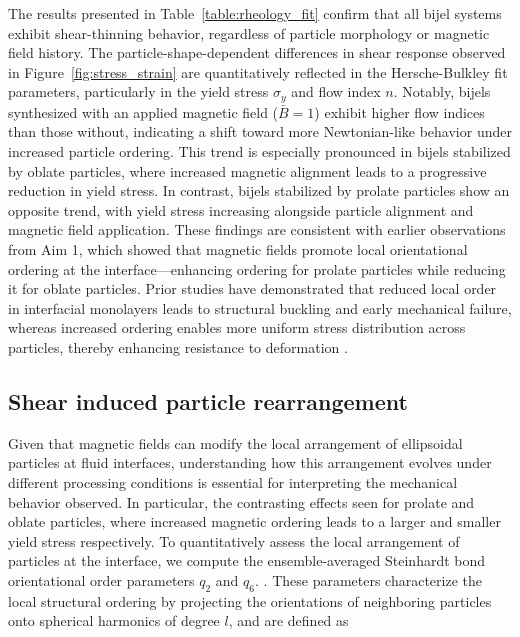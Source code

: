 The results presented in Table~\ref{table:rheology_fit} confirm that all bijel systems exhibit shear-thinning behavior, regardless of particle morphology or 
magnetic field history. The particle-shape-dependent differences in shear response observed in Figure~\ref{fig:stress_strain} are quantitatively reflected in 
the Hersche-Bulkley fit parameters, particularly in the yield stress $\sigma_y$ and flow index $n$. Notably, bijels synthesized with an applied magnetic field 
($\bar{B} = 1$) exhibit higher flow indices than those without, indicating a shift toward more Newtonian-like behavior under increased particle ordering. This 
trend is especially pronounced in bijels stabilized by oblate particles, where increased magnetic alignment leads to a progressive reduction in yield stress. 
In contrast, bijels stabilized by prolate particles show an opposite trend, with yield stress increasing alongside particle alignment and magnetic field 
application. These findings are consistent with earlier observations from Aim 1, which showed that magnetic fields promote local orientational ordering at the 
interface—enhancing ordering for prolate particles while reducing it for oblate particles. Prior studies have demonstrated that reduced local order in 
interfacial monolayers leads to structural buckling and early mechanical failure, whereas increased ordering enables more uniform stress distribution 
across particles, thereby enhancing resistance to deformation \cite{prakash_buckling_2024}.

\subsection{Shear induced particle rearrangement}

Given that magnetic fields can modify the local arrangement of ellipsoidal particles at fluid interfaces, understanding how this arrangement evolves under 
different processing conditions is essential for interpreting the mechanical 
behavior observed. In particular, the contrasting effects seen for prolate and oblate particles, where increased magnetic ordering leads to a larger
and smaller yield stress respectively. To quantitatively assess the local arrangement of particles at the interface, we compute the ensemble-averaged 
Steinhardt bond orientational order parameters $q_2$ and $q_6$. 
\cite{steinhardt_bond-orientational_1983, lechner_accurate_2008, mickel_shortcomings_2013}. These parameters characterize the local structural ordering by 
projecting the orientations of neighboring particles onto spherical harmonics of degree \(l\), and are defined as


